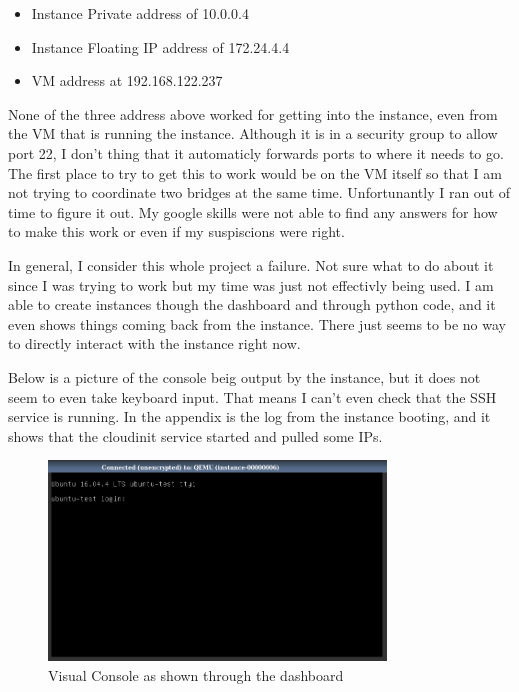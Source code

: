 \documentclass[12pt]{article}
\begin{document}
\begin{itemize}
	\item Instance Private address of 10.0.0.4
	\item Instance Floating IP address of 172.24.4.4
	\item VM address at 192.168.122.237
\end{itemize}

None of the three address above worked for getting into the instance, even from the VM that is running the instance.
Although it is in a security group to allow port 22, I don't thing that it automaticly forwards ports to where it needs to go.
The first place to try to get this to work would be on the VM itself so that I am not trying to coordinate two bridges at the same time.
Unfortunantly I ran out of time to figure it out.
My google skills were not able to find any answers for how to make this work or even if my suspiscions were right.

In general, I consider this whole project a failure.
Not sure what to do about it since I was trying to work but my time was just not effectivly being used.
I am able to create instances though the dashboard and through python code, and it even shows things coming back from the instance.
There just seems to be no way to directly interact with the instance right now.

Below is a picture of the console beig output by the instance, but it does not seem to even take keyboard input.
That means I can't even check that the SSH service is running.
In the appendix is the log from the instance booting, and it shows that the cloudinit service started and pulled some IPs.

\begin{figure}[ht]
	\centering
	\includegraphics[width=0.8\textwidth]{console.png} %
	\caption{Visual Console as shown through the dashboard}
\end{figure}
\end{document}
